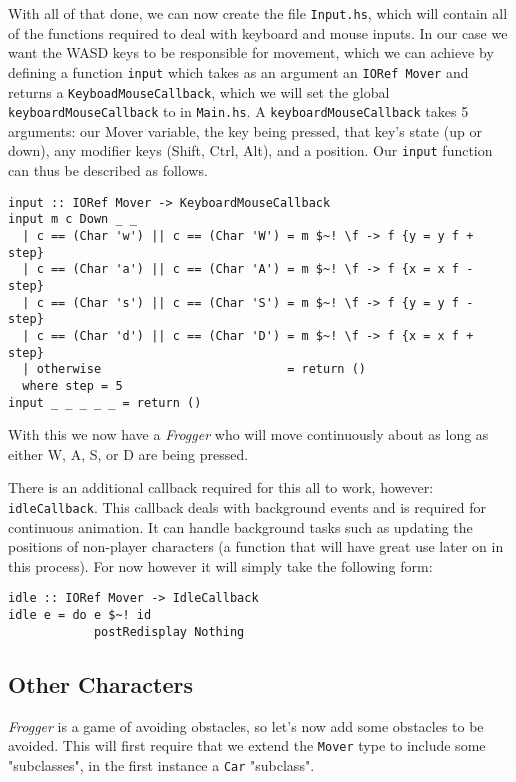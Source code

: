 \documentclass[12pt, a4paper]{report}
\begin{document}
\par

With all of that done, we can now create the file \verb|Input.hs|, which will contain all of the functions required to deal with keyboard and mouse inputs.
In our case we want the WASD keys to be responsible for movement, which we can achieve by defining a function \verb|input| which takes as an argument an \verb|IORef Mover| and returns a \verb|KeyboadMouseCallback|, which we will set the global \verb|keyboardMouseCallback| to in \verb|Main.hs|.
A \verb|keyboardMouseCallback| takes 5 arguments: our Mover variable, the key being pressed, that key's state (up or down), any modifier keys (Shift, Ctrl, Alt), and a position.
Our \verb|input| function can thus be described as follows.

\begin{lstlisting}[]
input :: IORef Mover -> KeyboardMouseCallback
input m c Down _ _
  | c == (Char 'w') || c == (Char 'W') = m $~! \f -> f {y = y f + step}
  | c == (Char 'a') || c == (Char 'A') = m $~! \f -> f {x = x f - step}
  | c == (Char 's') || c == (Char 'S') = m $~! \f -> f {y = y f - step}
  | c == (Char 'd') || c == (Char 'D') = m $~! \f -> f {x = x f + step}
  | otherwise                          = return ()
  where step = 5
input _ _ _ _ _ = return ()
\end{lstlisting}

With this we now have a \textit{Frogger} who will move continuously about as long as either W, A, S, or D are being pressed.

There is an additional callback required for this all to work, however: \verb|idleCallback|.
This callback deals with background events and is required for continuous animation.
It can handle background tasks such as updating the positions of non-player characters (a function that will have great use later on in this process).
For now however it will simply take the following form:

\begin{lstlisting}
idle :: IORef Mover -> IdleCallback
idle e = do e $~! id
            postRedisplay Nothing
\end{lstlisting}

\subsection{Other Characters}

\textit{Frogger} is a game of avoiding obstacles, so let's now add some obstacles to be avoided.
This will first require that we extend the \verb|Mover| type to include some "subclasses", in the first instance a \verb|Car| "subclass".
\end{document}
